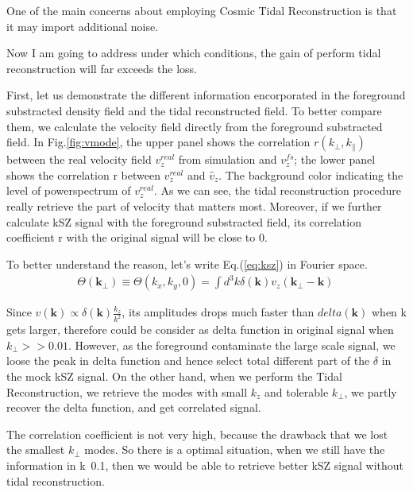 One of the main concerns about employing Cosmic Tidal Reconstruction is that it may import additional noise.

Now I am going to address under which conditions, the gain of perform tidal reconstruction will far exceeds the loss.

First, let us demonstrate the different information encorporated in the foreground substracted density field and the tidal reconstructed field.
To better compare them, we calculate the velocity field directly from the foreground substracted field.
In Fig.\ref{fig:vmode}, the upper panel shows the 
correlation $r(k_\perp,k_\parallel)$ between the real velocity field $v_z^{real}$ from simulation and $v_z^{fs}$; 
the lower panel shows the
correlation r between $v_z^{real}$ and $\hat v_z$. The background color indicating the level of powerspectrum of $v_z^{real}$. 
As we can see, the tidal reconstruction procedure really retrieve the part of velocity that matters most.
Moreover, if we further calculate kSZ signal with the foreground substracted field, its correlation coefficient r with the original signal will be close to 0.

To better understand the reason, let's write Eq.(\ref{eq:ksz}) in Fourier space.\begin{eqnarray}
\Theta(\bm{k_\perp})\equiv \Theta(k_x,k_y,0)=\int d^3k \delta(\bm{k}) v_z(\bm{k_\perp}-\bm{k})\,
\end{eqnarray}

Since $v(\bm{k})\propto \delta(\bm{k})\frac{k_z}{k^2}$, its amplitudes drops much faster than $delta(\bm{k})$ when k gets larger, therefore could be consider as delta function in original signal when $k_\perp>>0.01$.
However, as the foreground contaminate the large scale signal, we loose the peak in delta function and hence select total different part of the $\delta$ in the mock kSZ signal.
On the other hand, when we perform the Tidal Reconstruction, we retrieve the modes with small $k_z$ and tolerable $k_\perp$, we partly recover the delta function, and get correlated signal.

The correlation coefficient is not very high, because the drawback that we lost the smallest $k_\perp$ modes. So there is a optimal situation, when we still have the information in k~0.1, then we would be able to retrieve better kSZ signal without tidal reconstruction.
